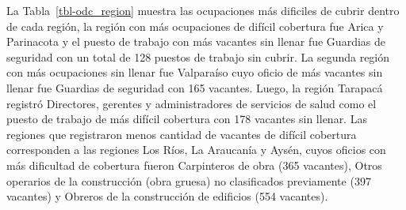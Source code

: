 \documentclass[
  11pt,
]{article}
\begin{document}
La Tabla~\ref{tbl-odc_region} muestra las ocupaciones más dificiles de
cubrir dentro de cada región, la región con más ocupaciones de difícil
cobertura fue Arica y Parinacota y el puesto de trabajo con más vacantes
sin llenar fue Guardias de seguridad con un total de 128 puestos de
trabajo sin cubrir. La segunda región con más ocupaciones sin llenar fue
Valparaíso cuyo oficio de más vacantes sin llenar fue Guardias de
seguridad con 165 vacantes. Luego, la región Tarapacá registró
Directores, gerentes y administradores de servicios de salud como el
puesto de trabajo de más difícil cobertura con 178 vacantes sin llenar.
Las regiones que registraron menos cantidad de vacantes de difícil
cobertura corresponden a las regiones Los Ríos, La Araucanía y Aysén,
cuyos oficios con más dificultad de cobertura fueron Carpinteros de obra
(365 vacantes), Otros operarios de la construcción (obra gruesa) no
clasificados previamente (397 vacantes) y Obreros de la construcción de
edificios (554 vacantes).
\end{document}
